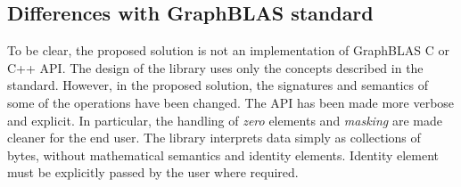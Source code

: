 \subsection{Differences with GraphBLAS standard}

To be clear, the proposed solution is not an implementation of GraphBLAS C or C++ API. 
The design of the library uses only the concepts described in the standard. 
However, in the proposed solution, the signatures and semantics of some of the operations have been changed. 
The API has been made more verbose and explicit. 
In particular, the handling of \textit{zero} elements and \textit{masking} are made cleaner for the end user. The library interprets data simply as collections of bytes, without mathematical semantics and identity elements.
Identity element must be explicitly passed by the user where required.